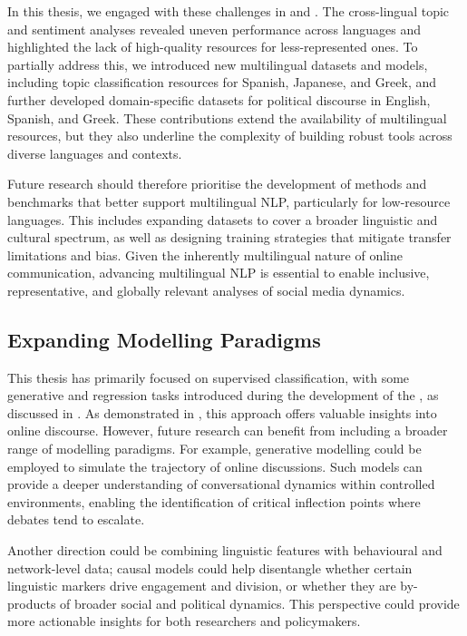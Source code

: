 In this thesis, we engaged with these challenges in  and . The cross-lingual topic and sentiment analyses revealed uneven performance across languages and highlighted the lack of high-quality resources for less-represented ones. To partially address this, we introduced new multilingual datasets and models, including topic classification resources for Spanish, Japanese, and Greek, and further developed domain-specific datasets for political discourse in English, Spanish, and Greek. These contributions extend the availability of multilingual resources, but they also underline the complexity of building robust tools across diverse languages and contexts.

Future research should therefore prioritise the development of methods and benchmarks that better support multilingual \ac{NLP}, particularly for low-resource languages. This includes expanding datasets to cover a broader linguistic and cultural spectrum, as well as designing training strategies that mitigate transfer limitations and bias. Given the inherently multilingual nature of online communication, advancing multilingual \ac{NLP} is essential to enable inclusive, representative, and globally relevant analyses of social media dynamics.



\subsection{Expanding Modelling Paradigms}
This thesis has primarily focused on supervised classification, with some generative and regression tasks introduced during the development of the {\DATASET}, as discussed in . As demonstrated in , this approach offers valuable insights into online discourse. However, future research can benefit from including a broader range of modelling paradigms. For example, generative modelling could be employed to simulate the trajectory of online discussions. Such models can provide a deeper understanding of conversational dynamics within controlled environments, enabling the identification of critical inflection points where debates tend to escalate.

Another direction could be combining linguistic features with behavioural and network-level data; causal models could help disentangle whether certain linguistic markers drive engagement and division, or whether they are by-products of broader social and political dynamics. This perspective could provide more actionable insights for both researchers and policymakers.  

